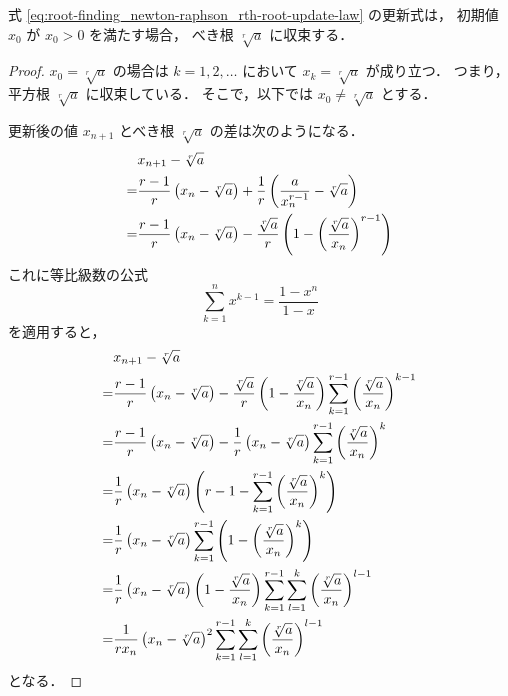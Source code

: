 \begin{theorem}
    式 \eqref{eq:root-finding_newton-raphson_rth-root-update-law} の更新式は，
    初期値 $x_0$ が $x_0 > 0$ を満たす場合，
    べき根 $\sqrt[r]{a}$ に収束する．
\end{theorem}
\begin{proof}
    $x_0 = \sqrt[r]{a}$ の場合は
    $k = 1, 2, \ldots$ において $x_k = \sqrt[r]{a}$ が成り立つ．
    つまり，平方根 $\sqrt[r]{a}$ に収束している．
    そこで，以下では $x_0 \neq \sqrt[r]{a}$ とする．

    更新後の値 $x_{n+1}$ とべき根 $\sqrt[r]{a}$ の差は次のようになる．
    \begin{align}
          & x_{n+1} - \sqrt[r]{a}                                    \notag \\
        = & \frac{r-1}{r} \left(x_n - \sqrt[r]{a}\right)
        + \frac{1}{r} \left(\frac{a}{x_n^{r-1}} - \sqrt[r]{a}\right) \notag \\
        = & \frac{r-1}{r} \left(x_n - \sqrt[r]{a}\right)
        -\frac{\sqrt[r]{a}}{r} \left(1 - \left(\frac{\sqrt[r]{a}}{x_n}\right)^{r-1}\right)
    \end{align}
    これに等比級数の公式
    \begin{equation}
        \sum_{k = 1}^n x^{k-1} = \frac{1 - x^n}{1 - x}
    \end{equation}
    を適用すると，
    \begin{align}
          & x_{n+1} - \sqrt[r]{a}                                                \notag     \\
        = & \frac{r-1}{r} \left(x_n - \sqrt[r]{a}\right)
        -\frac{\sqrt[r]{a}}{r} \left(1 - \frac{\sqrt[r]{a}}{x_n}\right)
        \sum_{k = 1}^{r - 1} \left(\frac{\sqrt[r]{a}}{x_n}\right)^{k - 1}        \notag     \\
        = & \frac{r-1}{r} \left(x_n - \sqrt[r]{a}\right)
        -\frac{1}{r} \left(x_n - \sqrt[r]{a}\right)
        \sum_{k = 1}^{r - 1} \left(\frac{\sqrt[r]{a}}{x_n}\right)^k              \notag     \\
        = & \frac{1}{r} \left(x_n - \sqrt[r]{a}\right)
        \left(r - 1 - \sum_{k = 1}^{r - 1} \left(\frac{\sqrt[r]{a}}{x_n}\right)^k\right)
        \label{eq:root-finding_newton-raphson_rth-root-error-update-linear}                 \\
        = & \frac{1}{r} \left(x_n - \sqrt[r]{a}\right)
        \sum_{k = 1}^{r - 1} \left(1 - \left(\frac{\sqrt[r]{a}}{x_n}\right)^k\right) \notag \\
        = & \frac{1}{r} \left(x_n - \sqrt[r]{a}\right)
        \left(1 - \frac{\sqrt[r]{a}}{x_n}\right)
        \sum_{k = 1}^{r - 1} \sum_{l = 1}^{k}
        \left(\frac{\sqrt[r]{a}}{x_n}\right)^{l - 1}                                 \notag \\
        = & \frac{1}{rx_n} \left(x_n - \sqrt[r]{a}\right)^2
        \sum_{k = 1}^{r - 1} \sum_{l = 1}^{k}
        \left(\frac{\sqrt[r]{a}}{x_n}\right)^{l - 1}
        \label{eq:root-finding_newton-raphson_rth-root-error-update-quadratic}
    \end{align}
    となる．


\end{proof}
